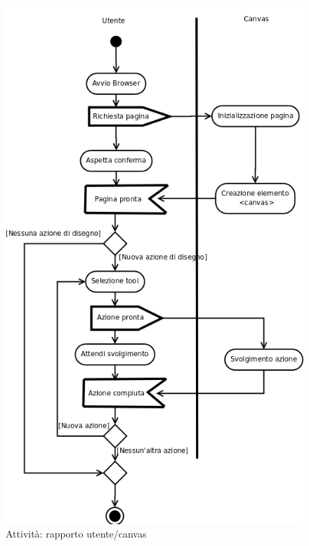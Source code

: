 \begin{figure}[!ht]
\centering
\includegraphics[scale=0.8]{images/ActivityGUI.png}
\caption{Attivit\` a: rapporto utente/canvas}
\end{figure}
\newpage

